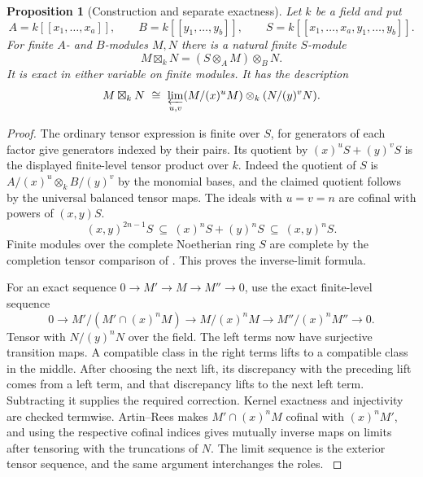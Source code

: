 \documentclass[11pt,oneside,openany]{book}
\newtheorem{proposition}[theorem]{Proposition}
\theoremstyle{definition}
\theoremstyle{remark}
\begin{document}
\begin{proposition}[Construction and separate exactness]\label{res:I07}
Let \(k\) be a field and put
\[
 A=k[[x_1,\ldots,x_a]],\qquad B=k[[y_1,\ldots,y_b]],
 \qquad S=k[[x_1,\ldots,x_a,y_1,\ldots,y_b]] .
\]
For finite \(A\)- and \(B\)-modules \(M,N\) there is a natural finite
\(S\)-module
\[
 M\boxtimes_k N=(S\otimes_A M)\otimes_B N.
\]
It is exact in either variable on finite modules. It has the
description
\[
 M\boxtimes_k N
   \ \cong\
 \varprojlim_{u,v}
   (M/(x)^uM)\otimes_k(N/(y)^vN).
\]
\end{proposition}
\begin{proof}
The ordinary tensor expression is finite over \(S\), for generators
of each factor give generators indexed by their pairs. Its quotient by
\((x)^uS+(y)^vS\) is the displayed finite-level tensor product over \(k\).
Indeed the quotient of \(S\) is
\(A/(x)^u\otimes_k B/(y)^v\) by the monomial bases, and the claimed
quotient follows by the universal balanced tensor maps.
The ideals with \(u=v=n\) are cofinal with powers of \((x,y)S\).
\[
 (x,y)^{2n-1}S\ \subseteq\ (x)^nS+(y)^nS\
             \subseteq\ (x,y)^nS .
\]
Finite modules over the complete Noetherian ring \(S\) are complete
by the completion tensor comparison of
\cite[ALG-05-C04-R03]{p103}. This proves the inverse-limit formula.

For an exact sequence \(0\to M'\to M\to M''\to0\), use the exact
finite-level sequence
\[
 0\to M'/(M'\cap(x)^nM)\to M/(x)^nM\to M''/(x)^n M''\to0 .
\]
Tensor with \(N/(y)^nN\) over the field. The left terms now have
surjective transition maps. A compatible class in the right terms
lifts to a compatible class in the middle. After choosing the
next lift, its discrepancy with the preceding lift comes from a
left term, and that discrepancy lifts to the next left term.
Subtracting it supplies the required correction. Kernel exactness
and injectivity are checked termwise. Artin--Rees makes
\(M'\cap(x)^nM\) cofinal with \((x)^nM'\), and using the respective
cofinal indices gives mutually inverse maps on limits after tensoring
with the truncations of \(N\). The limit sequence is the exterior
tensor sequence, and the same argument interchanges the roles.
\cite[Chapter V, \S B.2]{serre-local}
\end{proof}
\end{document}
